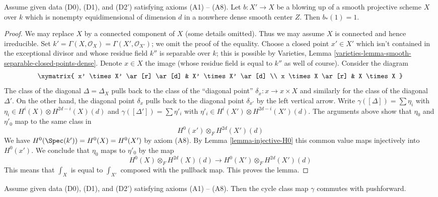 \begin{lemma}
\label{lemma-pushforward-blowup}
Assume given data (D0), (D1), and (D2') satisfying axioms (A1) -- (A8).
Let $b : X' \to X$ be a blowing up of a smooth projective scheme $X$
over $k$ which is nonempty equidimensional of dimension $d$
in a nonwhere dense smooth center $Z$. Then $b_*(1) = 1$.
\end{lemma}

\begin{proof}
We may replace $X$ by a connected component of $X$ (some details
omitted). Thus we may assume $X$ is connected and hence irreducible.
Set $k' = \Gamma(X, \mathcal{O}_X) = \Gamma(X', \mathcal{O}_{X'})$;
we omit the proof of the equality. Choose a closed point $x' \in X'$
which isn't contained in the exceptional divisor and whose residue field
$k''$ is separable over $k$; this is possible by
Varieties, Lemma \ref{varieties-lemma-smooth-separable-closed-points-dense}.
Denote $x \in X$ the image (whose residue field is equal to $k''$
as well of course). Consider the diagram
$$
\xymatrix{
x' \times X' \ar[r] \ar[d] & X' \times X' \ar[d] \\
x \times X \ar[r] & X \times X
}
$$
The class of the diagonal $\Delta = \Delta_X$ pulls back to the class of the
``diagonal point'' $\delta_x : x \to x \times X$ and similarly for the class of
the diagonal $\Delta'$. On the other hand, the diagonal point $\delta_x$
pulls back to the diagonal point $\delta_{x'}$ by the left vertical arrow.
Write $\gamma([\Delta]) = \sum \eta_i$ with
$\eta_i \in H^i(X) \otimes H^{2d - i}(X)(d)$ and
$\gamma([\Delta']) = \sum \eta'_i$ with
$\eta'_i \in H^i(X') \otimes H^{2d - i}(X')(d)$.
The arguments above show that $\eta_0$ and $\eta'_0$ map to the same
class in
$$
H^0(x') \otimes_F H^{2d}(X')(d)
$$
We have $H^0(\Spec(k')) = H^0(X) = H^0(X')$ by axiom (A8).
By Lemma \ref{lemma-injective-H0} this common value maps injectively
into $H^0(x')$. We conclude that $\eta_0$ maps to $\eta'_0$ by the map
$$
H^0(X) \otimes_F H^{2d}(X)(d)
\longrightarrow
H^0(X') \otimes_F H^{2d}(X')(d)
$$
This means that $\int_X$ is equal to $\int_{X'}$ composed with
the pullback map. This proves the lemma.
\end{proof}

\begin{lemma}
\label{lemma-done}
Assume given data (D0), (D1), and (D2') satisfying axioms (A1) -- (A8).
Then the cycle class map $\gamma$ commutes with pushforward.
\end{lemma}

